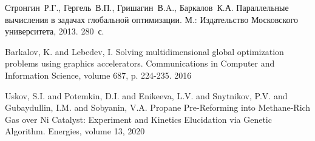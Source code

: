 \documentclass[11pt, oneside, a4paper]{article}
\begin{document}
\begin{biblio}


Стронгин~Р.Г., Гергель~В.П., Гришагин~В.A., Баркалов~К.А. Параллельные вычисления в задачах глобальной оптимизации. М.: Издательство Московского университета, 2013. 280~с.

 Barkalov, K. and Lebedev, I. Solving multidimensional global optimization problems using graphics accelerators. 
Communications in Computer and Information Science, volume 687, p. 224-235. 2016

 Uskov, S.I. and Potemkin, D.I. and Enikeeva, L.V. and Snytnikov, P.V. and Gubaydullin, I.M. and Sobyanin, V.A. Propane Pre-Reforming into Methane-Rich Gas over Ni Catalyst: Experiment and Kinetics Elucidation via Genetic Algorithm. Energies, volume  13, {2020}


\end{biblio}
\end{document}
